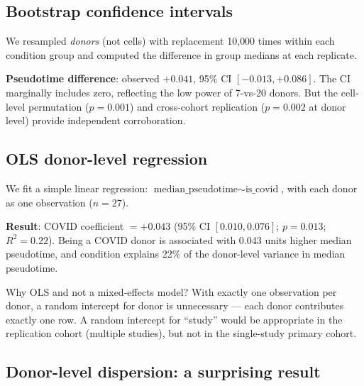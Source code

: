 \documentclass[11pt]{article}
\begin{document}
\subsection{Bootstrap confidence intervals}

We resampled \emph{donors} (not cells) with replacement 10{,}000 times within each condition group and computed the difference in group medians at each replicate.

\begin{resultbox}
\textbf{Pseudotime difference}: observed $+0.041$, 95\% CI $[-0.013, +0.086]$. The CI marginally includes zero, reflecting the low power of 7-vs-20 donors. But the cell-level permutation ($p = 0.001$) and cross-cohort replication ($p = 0.002$ at donor level) provide independent corroboration.
\end{resultbox}

\subsection{OLS donor-level regression}

We fit a simple linear regression: $\text{median\_pseudotime} \sim \text{is\_covid}$, with each donor as one observation ($n = 27$).

\begin{resultbox}
\textbf{Result}: COVID coefficient $= +0.043$ (95\% CI $[0.010, 0.076]$; $p = 0.013$; $R^2 = 0.22$). Being a COVID donor is associated with 0.043 units higher median pseudotime, and condition explains 22\% of the donor-level variance in median pseudotime.
\end{resultbox}

\begin{whyblock}
Why OLS and not a mixed-effects model? With exactly one observation per donor, a random intercept for donor is unnecessary --- each donor contributes exactly one row. A random intercept for ``study'' would be appropriate in the replication cohort (multiple studies), but not in the single-study primary cohort.
\end{whyblock}

\subsection{Donor-level dispersion: a surprising result}
\end{document}
